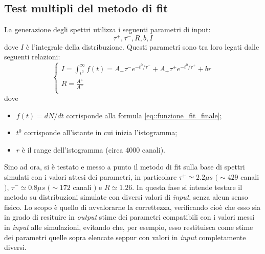\documentclass[10pt, oneside, a4paper]{article}   	%
\begin{document}
\subsection{Test multipli del metodo di fit}
La generazione degli spettri utilizza i seguenti parametri di input:
$$\tau^+,\tau^-,R,b,I$$
dove $I$ è l'integrale della distribuzione. Questi parametri sono tra loro legati dalle seguenti relazioni:
\begin{equation}
 \begin{cases}
  I = \int_{t^0}^\infty f(t) = A_-\tau^-e^{-t^0/\tau^-} + A_+\tau^+e^{-t^0/\tau^+} + br \\
  R = \frac{A^+}{A^-} \\
 \end{cases}
 \label{eq::condizioni_parametri}
\end{equation}
dove 
\begin{itemize}
 \item $f(t) = dN/dt$ corrisponde alla formula \ref{eq::funzione_fit_finale};
 \item $t^0$ corrisponde all'istante in cui inizia l'istogramma;
 \item $r$ è il range dell'istogramma (circa 4000 canali).
\end{itemize}
Sino ad ora, si è testato e messo a punto il metodo di fit sulla base di spettri simulati con i valori attesi dei parametri, in particolare $\tau^+ \simeq 2.2 \mu s$ $(\sim 429$ canali $)$, $\tau^- \simeq 0.8 \mu s$ $(\sim 172$ canali $)$ e $R\simeq1.26$. 
In questa fase si intende testare il metodo su distribuzioni simulate con diversi valori di \textit{input}, senza alcun senso fisico. Lo scopo è quello di avvalorarne la correttezza, verificando cioè che esso sia in grado di resituire in \textit{output} stime dei parametri compatibili con i valori messi in \textit{input} alle simulazioni, evitando che, per esempio, esso restituisca come stime dei parametri quelle sopra elencate seppur con valori in \textit{input} completamente diversi. 
\end{document}
